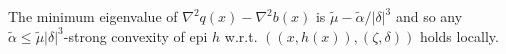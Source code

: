 \documentclass[sn-mathphys,Numbered]{sn-jnl}%
\newcommand{\epi}{\text{epi }}
\newcommand{\hypo}{\text{hypo }}
\begin{document}
\begin{appendices}
{The minimum eigenvalue of $\nabla^2 q(x)-\nabla^2 b(x)$ is $\tilde \mu - \tilde\alpha/|\delta|^3$ and so any $\tilde \alpha \leq  \tilde \mu|\delta|^3$-strong convexity of $\epi h$ w.r.t. $((x,h(x)),(\zeta,\delta))$ holds locally.



}
\end{appendices}
\end{document}
